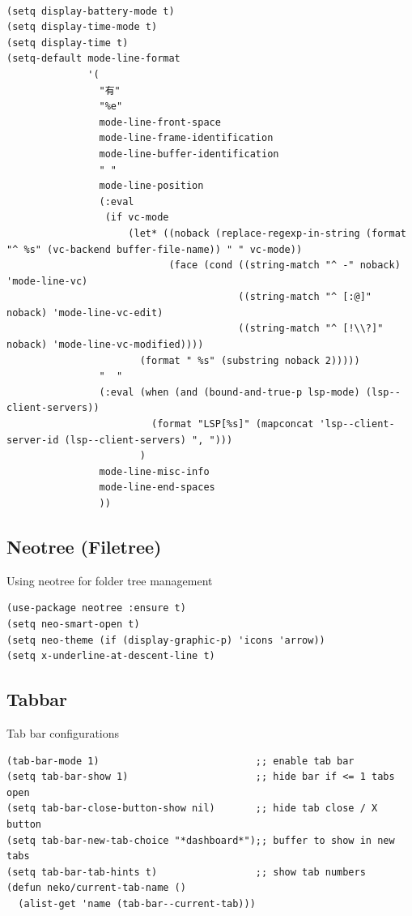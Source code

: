 \documentclass[11pt]{article}
\begin{document}
\begin{verbatim}

(setq display-battery-mode t)
(setq display-time-mode t)
(setq display-time t)
(setq-default mode-line-format
              '(
                "有"
                "%e"
                mode-line-front-space
                mode-line-frame-identification
                mode-line-buffer-identification
                " "
                mode-line-position
                (:eval
                 (if vc-mode
                     (let* ((noback (replace-regexp-in-string (format "^ %s" (vc-backend buffer-file-name)) " " vc-mode))
                            (face (cond ((string-match "^ -" noback) 'mode-line-vc)
                                        ((string-match "^ [:@]" noback) 'mode-line-vc-edit)
                                        ((string-match "^ [!\\?]" noback) 'mode-line-vc-modified))))
                       (format " %s" (substring noback 2)))))
                "  "
                (:eval (when (and (bound-and-true-p lsp-mode) (lsp--client-servers))
                         (format "LSP[%s]" (mapconcat 'lsp--client-server-id (lsp--client-servers) ", ")))
                       )
                mode-line-misc-info
                mode-line-end-spaces
                ))
\end{verbatim}

\subsection{Neotree (Filetree)}
\label{sec:orgc95dc41}

Using neotree for folder tree management

\begin{verbatim}
(use-package neotree :ensure t)
(setq neo-smart-open t)
(setq neo-theme (if (display-graphic-p) 'icons 'arrow))
(setq x-underline-at-descent-line t)
\end{verbatim}

\subsection{Tabbar}
\label{sec:org216fd4a}

Tab bar configurations

\begin{verbatim}
(tab-bar-mode 1)                           ;; enable tab bar
(setq tab-bar-show 1)                      ;; hide bar if <= 1 tabs open
(setq tab-bar-close-button-show nil)       ;; hide tab close / X button
(setq tab-bar-new-tab-choice "*dashboard*");; buffer to show in new tabs
(setq tab-bar-tab-hints t)                 ;; show tab numbers
(defun neko/current-tab-name ()
  (alist-get 'name (tab-bar--current-tab)))
\end{verbatim}
\end{document}
